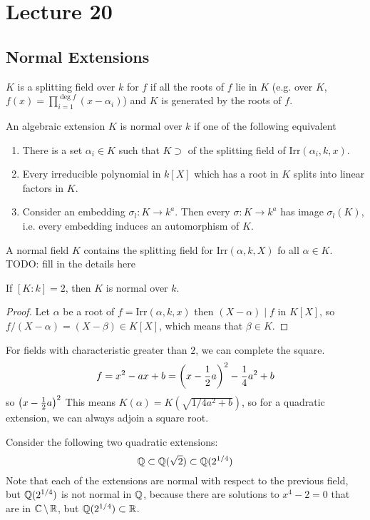 \section{Lecture 20}
\subsection{Normal Extensions}
\begin{definition}
    $K$ is a splitting field over $k$ for $f$
    if all the roots of $f$ lie in $K$ (e.g. over $K$,
    $f(x) = \prod_{i = 1}^{\deg f} (x - \alpha_i)$)
    and $K$ is generated by the roots of $f$.
\end{definition}

\begin{definition}
    An algebraic extension $K$ is normal over $k$ if one of the following
    equivalent  
    \begin{enumerate}
    \item There is a set $\alpha_i \in K$
    such that $K \supset$ of the splitting field of $\textrm{Irr}(\alpha_i, k, x)$.
    \item Every irreducible polynomial in $k[X]$
    which has a root in $K$ splits into linear factors in $K$.
    \item Consider an embedding $\sigma_l: K \to k^a$. Then every $\sigma: K \to k^a$
    has image $\sigma_l(K)$, i.e. every embedding induces an automorphism of $K$.
    \end{enumerate}
\end{definition}

A normal field $K$ contains the 
splitting field for $\textrm{Irr}(\alpha, k, X)$
fo all $\alpha \in K$. TODO: fill in the details here

\begin{theorem}
    If $[K: k] = 2$, then $K$ is normal over $k$.
    \begin{proof}
        Let $\alpha$ be a root of $f = \text{Irr}(\alpha, k, x)$
        then $(X - \alpha) \mid f$ in $K[X]$, so $f/(X-\alpha) = (X - \beta) \in K[X]$,
        which means that $\beta \in K$.
    \end{proof}
\end{theorem}

For fields with characteristic greater than $2$,
we can complete the square.
\[ f = x^2 - ax + b = \qty(x - \frac{1}{2}a)^2 - \frac{1}{4} a^2 + b \]
so $\qty(x - \frac{1}{2}a)^2$
This means $K(\alpha) = K(\sqrt{1/4 a^2 + b})$, so
for a quadratic extension,
we can always adjoin a square root.
\begin{example}
    Consider the following two quadratic extensions:
    \[ \operatorname{\mathbb{Q}} \subset \operatorname{\mathbb{Q}}(\sqrt{2}) \subset \operatorname{\mathbb{Q}}(2^{1/4}) \]
    Note that each of the extensions are normal with respect to the previous field,
    but $\operatorname{\mathbb{Q}}(2^{1/4})$ is not normal in $\operatorname{\mathbb{Q}}$, because there are solutions to $x^4 - 2 = 0$
    that are in $\operatorname{\mathbb{C}} \setminus \operatorname{\mathbb{R}}$, but $\operatorname{\mathbb{Q}}(2^{1/4}) \subset \operatorname{\mathbb{R}}$.
\end{example}

